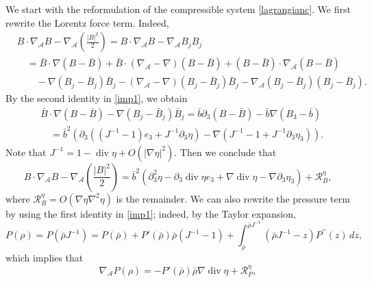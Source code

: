 \documentclass[a4paper,reqno,11pt]{amsart}
\numberwithin{equation}{section}
\begin{document}
We start with the reformulation of the compressible system \eqref{lagrangianc}. We first rewrite the Lorentz force term. Indeed,
\begin{equation}
\begin{split}
& {B} \cdot \nabla_{\mathcal{A}}  {B}-\nabla_{\mathcal{A}} \left(\frac{| {B}|^2}{2} \right) = {B} \cdot \nabla_{\mathcal{A}}  {B}-\nabla_{\mathcal{A}} B_j B_j
\\ &\quad = \bar B \cdot\nabla  (B-\bar B)+  \bar B \cdot(\nabla_{\mathcal{A}}-\nabla) (B-\bar B)+ (B -\bar B ) \cdot\nabla_{\mathcal{A}} (B-\bar B)
\\ &\qquad-\nabla  (B_j-\bar B_j) \bar B_j-(\nabla_{\mathcal{A}}-\nabla)  (B_j-\bar B_j) \bar B_j -\nabla_{\mathcal{A}} (B_j-\bar B_j) (B_j-\bar B_j).
\end{split}
\end{equation}
By the second identity in \eqref{imp1}, we obtain
\begin{equation}
\begin{split}
&\bar B \cdot\nabla  (B-\bar B)-\nabla  (B_j-\bar B_j) \bar B_j=\bar b{\partial}_3(B-\bar B)-\bar b \nabla(B_3-\bar b)
\\&\quad=\bar b^2\left({\partial}_3( (J^{-1}-1)  e_3+J^{-1}{\partial}_3\eta)-\nabla (J^{-1}-1+J^{-1}{\partial}_3\eta_3 )\right).
\end{split}
\end{equation}
Note that $J^{-1}=1-\operatorname{div} \eta+O(|\nabla\eta|^2)$. Then we conclude that
\begin{equation}\label{reb}
  {B} \cdot \nabla_{\mathcal{A}}  {B}-\nabla_{\mathcal{A}} \left(\frac{| {B}|^2}{2} \right)
 =  \bar b^2\left( {\partial}_3^2\eta- {\partial}_3\operatorname{div} \eta e_3+\nabla\operatorname{div} \eta- \nabla{\partial}_3\eta_3\right)+ \mathcal{R}_B^\eta,
\end{equation}
where $\mathcal{R}_B^\eta=O(\nabla\eta\nabla^2\eta)$ is the remainder.
We can also rewrite the pressure term by using the first identity in \eqref{imp1}; indeed, by the Taylor expansion,
\begin{equation}\label{R1}
P(\rho)= P(\bar\rho J^{-1})=P (\bar{\rho} )+P '(\bar{\rho} )\bar\rho (J^{-1}-1)+\int_{\bar{\rho} }^{\bar\rho J^{-1}}(\bar\rho J^{-1}-z)  P ^{\prime\prime}(z)\,dz,
\end{equation}
which implies that
\begin{equation}\label{rebp}
\nabla_{\mathcal{A}}   P(\rho) =-P '(\bar{\rho} )\bar\rho \nabla \operatorname{div} \eta+\mathcal{R}_P^\eta,
\end{equation}
\end{document}

